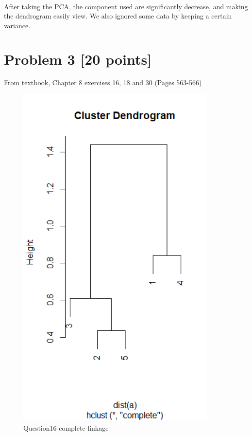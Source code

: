 \documentclass{article}
\begin{document}
\paragraph{}
After taking the PCA, the component used are significantly decrease, and making the dendrogram easily view. We also ignored some data by keeping a certain variance.
  \section*{Problem 3 [20 points]} 
From textbook, Chapter 8 exercises 16, 18 and 30 (Pages 563-566)
\begin{figure}
  \includegraphics[width=100mm, scale = 0.5]{complete16.png}
  \caption{Question16 complete linkage}
\end{figure}
\end{document}
